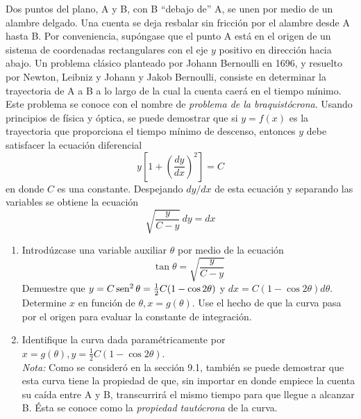 \item Dos puntos del plano, A y B, con B ``debajo de'' A, se unen por medio de un alambre delgado. Una cuenta se deja resbalar sin fricción por el alambre desde A hasta B. Por conveniencia, supóngase que el punto A está en el origen de un sistema de coordenadas rectangulares con el eje $y$ positivo en dirección hacia abajo. Un problema clásico planteado por Johann Bernoulli en 1696, y resuelto por Newton, Leibniz y Johann y Jakob Bernoulli, consiste en determinar la trayectoria de A a B a lo largo de la cual la cuenta caerá en el tiempo mínimo. Este problema se conoce con el nombre de \textit{problema de la braquistócrona}. Usando principios de física y óptica, se puede demostrar que si $y = f(x)$ es la trayectoria que proporciona el tiempo mínimo de descenso, entonces $y$ debe satisfacer la ecuación diferencial
    \[ y \left[ 1 + \left(\frac{dy}{dx}\right)^2 \right] = C \]
    en donde $C$ es una constante. Despejando $dy/dx$ de esta ecuación y separando las variables se obtiene la ecuación
    \[ \sqrt{\frac{y}{C - y}} \, dy = dx \]
    \begin{enumerate}
        \item[(a)] Introdúzcase una variable auxiliar $\theta$ por medio de la ecuación
        \[ \tan\theta = \sqrt{\frac{y}{C - y}} \]
        Demuestre que $y = C\operatorname{sen}^2\theta = \frac{1}{2}C(1 - \cos 2\theta)$ y $dx = C(1 - \cos 2\theta)d\theta$. Determine $x$ en función de $\theta, x = g(\theta)$. Use el hecho de que la curva pasa por el origen para evaluar la constante de integración.
        \item[(b)] Identifique la curva dada paramétricamente por $x = g(\theta), y = \frac{1}{2}C(1 - \cos 2\theta)$. \\
        \textit{Nota:} Como se consideró en la sección 9.1, también se puede demostrar que esta curva tiene la propiedad de que, sin importar en donde empiece la cuenta su caída entre A y B, transcurrirá el mismo tiempo para que llegue a alcanzar B. Ésta se conoce como la \textit{propiedad tautócrona} de la curva.
    \end{enumerate}
